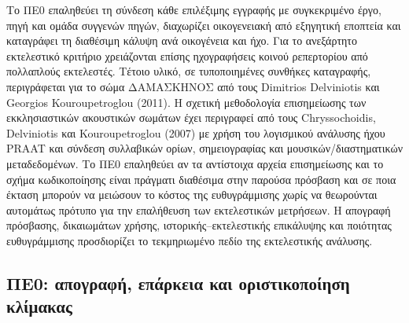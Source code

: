 \documentclass[11pt,a4paper]{article}
\begin{document}
Το ΠΕ0 επαληθεύει τη σύνδεση κάθε επιλέξιμης εγγραφής με συγκεκριμένο έργο, πηγή και ομάδα συγγενών πηγών, διαχωρίζει οικογενειακή από εξηγητική εποπτεία και καταγράφει τη διαθέσιμη κάλυψη ανά οικογένεια και ήχο. Για το ανεξάρτητο εκτελεστικό κριτήριο χρειάζονται επίσης ηχογραφήσεις κοινού ρεπερτορίου από πολλαπλούς εκτελεστές. Τέτοιο υλικό, σε τυποποιημένες συνθήκες καταγραφής, περιγράφεται για το σώμα ΔΑΜΑΣΚΗΝΟΣ από τους Dimitrios Delviniotis και Georgios Kouroupetroglou (2011). Η σχετική μεθοδολογία επισημείωσης των εκκλησιαστικών ακουστικών σωμάτων έχει περιγραφεί από τους Chryssochoidis, Delviniotis και Kouroupetroglou (2007) με χρήση του λογισμικού ανάλυσης ήχου PRAAT και σύνδεση συλλαβικών ορίων, σημειογραφίας και μουσικών/διαστηματικών μεταδεδομένων. Το ΠΕ0 επαληθεύει αν τα αντίστοιχα αρχεία επισημείωσης και το σχήμα κωδικοποίησης είναι πράγματι διαθέσιμα στην παρούσα πρόσβαση και σε ποια έκταση μπορούν να μειώσουν το κόστος της ευθυγράμμισης χωρίς να θεωρούνται αυτομάτως πρότυπο για την επαλήθευση των εκτελεστικών μετρήσεων. Η απογραφή πρόσβασης, δικαιωμάτων χρήσης, ιστορικής--εκτελεστικής επικάλυψης και ποιότητας ευθυγράμμισης προσδιορίζει το τεκμηριωμένο πεδίο της εκτελεστικής ανάλυσης.

\subsection{ΠΕ0: απογραφή, επάρκεια και οριστικοποίηση κλίμακας}\label{sec:pilot-decision}
\end{document}
